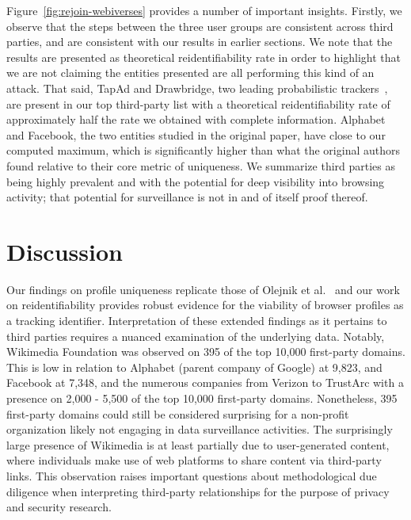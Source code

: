 \documentclass[letterpaper,twocolumn,10pt]{article}
\begin{document}
%
Figure~\ref{fig:rejoin-webiverses} provides a number of important insights. 
Firstly, we observe that the steps between the three user groups are consistent across third parties, and are consistent with our results in earlier sections. 
We note that the results are presented as theoretical reidentifiability rate in order to highlight that we are not claiming the entities presented are all performing this kind of an attack.
That said, TapAd and Drawbridge, two leading probabilistic trackers~\cite{biltonCrossdeviceTrackingExplained2015, brookmanCrossDeviceTrackingMeasurement2017}, are present in our top third-party list with a theoretical reidentifiability rate of approximately half the rate we obtained with complete information.
Alphabet and Facebook, the two entities studied in the original paper, have close to our computed maximum, which is significantly higher than what the original authors found relative to their core metric of uniqueness. 
We summarize third parties as being highly prevalent and with the potential for deep visibility into browsing activity; that potential for surveillance is not in and of itself proof thereof.
\section{Discussion}
\label{sec:discussion}
%
Our findings on profile uniqueness replicate those of Olejnik et al.~\cite{olejnikWhyJohnnyCan2012} and our work on reidentifiability provides robust evidence for the viability of browser profiles as a tracking identifier.
Interpretation of these extended findings as it pertains to third parties requires a nuanced examination of the underlying data.
Notably, Wikimedia Foundation was observed on 395 of the top 10,000 first-party domains.
This is low in relation to Alphabet (parent company of Google) at 9,823, and Facebook at 7,348, and the numerous companies from Verizon to TrustArc with a presence on 2,000 - 5,500 of the top 10,000 first-party domains. 
Nonetheless, 395 first-party domains could still be considered surprising for a non-profit organization likely not engaging in data surveillance activities.
The surprisingly large presence of Wikimedia is at least partially due to user-generated content, where individuals make use of web platforms to share content via third-party links.
This observation raises important questions about methodological due diligence when interpreting third-party relationships for the purpose of privacy and security research.
\end{document}
